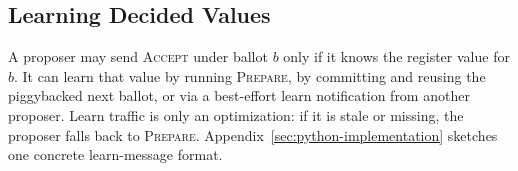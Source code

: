 \subsection{Learning Decided Values}
\label{sec:learning-committed-values}

A proposer may send \textsc{Accept} under ballot $b$ only if it knows the register value for $b$.
It can learn that value by running \textsc{Prepare}, by committing and reusing the piggybacked next ballot, or via a best-effort learn notification from another proposer.
Learn traffic is only an optimization: if it is stale or missing, the proposer falls back to \textsc{Prepare}.
Appendix~\ref{sec:python-implementation} sketches one concrete learn-message format.

